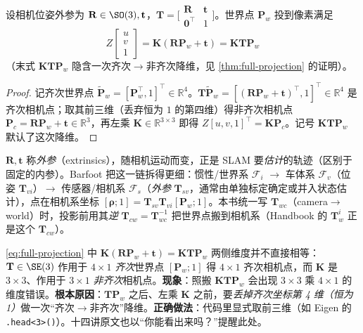 \begin{theorem}[完整成像方程]\label{thm:full-projection}
设相机位姿外参为 $\mathbf{R}\in\SO(3),\mathbf{t}$，$\mathbf{T}=\big[\begin{smallmatrix}\mathbf{R}&\mathbf{t}\\\mathbf{0}^\top&1\end{smallmatrix}\big]$。世界点 $\mathbf{P}_w$ 投到像素满足
\begin{equation}
  \boxed{\ Z\begin{bmatrix}u\\v\\1\end{bmatrix}=\mathbf{K}(\mathbf{R}\mathbf{P}_w+\mathbf{t})=\mathbf{K}\mathbf{T}\mathbf{P}_w\ }
  \label{eq:full-projection}
\end{equation}
（末式 $\mathbf{K}\mathbf{T}\mathbf{P}_w$ 隐含一次齐次$\to$非齐次降维，见 \cref{thm:full-projection} 的证明）。
\end{theorem}
\begin{proof}
记齐次世界点 $\tilde{\mathbf{P}}_w=[\mathbf{P}_w^\top,1]^\top\in\mathbb{R}^4$。$\mathbf{T}\tilde{\mathbf{P}}_w=[(\mathbf{R}\mathbf{P}_w+\mathbf{t})^\top,1]^\top\in\mathbb{R}^4$ 是齐次相机点；取其前三维（丢弃恒为 $1$ 的第四维）得非齐次相机点 $\mathbf{P}_c=\mathbf{R}\mathbf{P}_w+\mathbf{t}\in\mathbb{R}^3$，再左乘 $\mathbf{K}\in\mathbb{R}^{3\times3}$ 即得 $Z[u,v,1]^\top=\mathbf{K}\mathbf{P}_c$。记号 $\mathbf{K}\mathbf{T}\mathbf{P}_w$ 默认了这次降维。
\end{proof}

\noindent $\mathbf{R},\mathbf{t}$ 称\emph{外参}（extrinsics），随相机运动而变，正是 SLAM 要\emph{估计}的轨迹（区别于固定的内参）\cite{gaoxiang2019slam14}。Barfoot\cite{barfoot2024state} 把这一链拆得更细：惯性/世界系 $\mathcal{F}_i$ $\to$ 车体系 $\mathcal{F}_v$（位姿 $\mathbf{T}_{vi}$）$\to$ 传感器/相机系 $\mathcal{F}_s$（\emph{外参} $\mathbf{T}_{sv}$，通常由单独标定确定或并入状态估计），点在相机系坐标 $[\boldsymbol\rho;1]=\mathbf{T}_{sv}\mathbf{T}_{vi}[\mathbf{P}_w;1]$。本书统一写 $\mathbf{T}_{wc}$（camera$\to$world）时，投影前用其\emph{逆} $\mathbf{T}_{cw}=\mathbf{T}_{wc}^{-1}$ 把世界点搬到相机系（Handbook 的 $\mathbf{T}_w^i$ 正是这个 $\mathbf{T}_{cw}$\cite{carlone2026handbook}）。

\begin{pitfall}
\cref{eq:full-projection} 中 $\mathbf{K}(\mathbf{R}\mathbf{P}_w+\mathbf{t})=\mathbf{K}\mathbf{T}\mathbf{P}_w$ 两侧维度并不直接相等：$\mathbf{T}\in\SE(3)$ 作用于 $4\times1$ \emph{齐次}世界点 $[\mathbf{P}_w;1]$ 得 $4\times1$ 齐次相机点，而 $\mathbf{K}$ 是 $3\times3$、作用于 $3\times1$ \emph{非齐次}相机点。\textbf{现象}：照搬 $\mathbf{K}\mathbf{T}\mathbf{P}_w$ 会出现 $3\times3$ 乘 $4\times1$ 的维度错误。\textbf{根本原因}：$\mathbf{T}\mathbf{P}_w$ 之后、左乘 $\mathbf{K}$ 之前，要\emph{丢掉齐次坐标第 4 维（恒为 1）}做一次“齐次$\to$非齐次”降维。\textbf{正确做法}：代码里显式取前三维（如 Eigen 的 \texttt{.head<3>()}）。十四讲原文也以“你能看出来吗？”提醒此处\cite{gaoxiang2019slam14}。
\end{pitfall}

